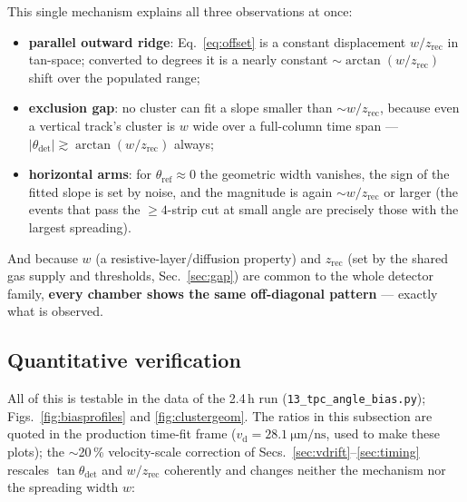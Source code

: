\documentclass[11pt,a4paper]{article}
\newcommand{\vd}{v_{\mathrm{d}}}
\newcommand{\thref}{\theta_{\mathrm{ref}}}
\newcommand{\thdet}{\theta_{\mathrm{det}}}
\newcommand{\umns}{\micro\meter\per\nano\second}
\begin{document}
This single mechanism explains all three observations at once:
\begin{itemize}
  \item \textbf{parallel outward ridge}: Eq.~\eqref{eq:offset} is a constant
        displacement $w/z_{\mathrm{rec}}$ in tan-space; converted to degrees
        it is a nearly constant $\sim\arctan(w/z_{\mathrm{rec}})$ shift over
        the populated range;
  \item \textbf{exclusion gap}: no cluster can fit a slope smaller than
        $\sim w/z_{\mathrm{rec}}$, because even a vertical track's cluster is
        $w$ wide over a full-column time span ---
        $|\thdet| \gtrsim \arctan(w/z_{\mathrm{rec}})$ always;
  \item \textbf{horizontal arms}: for $\thref\approx 0$ the geometric width
        vanishes, the sign of the fitted slope is set by noise, and the
        magnitude is again $\sim w/z_{\mathrm{rec}}$ or larger (the events
        that pass the $\geq 4$-strip cut at small angle are precisely those
        with the largest spreading).
\end{itemize}
And because $w$ (a resistive-layer/diffusion property) and $z_{\mathrm{rec}}$
(set by the shared gas supply and thresholds, Sec.~\ref{sec:gap}) are common
to the whole detector family, \textbf{every chamber shows the same
off-diagonal pattern} --- exactly what is observed.

\subsection{Quantitative verification}

All of this is testable in the data of the 2.4\,h run
(\texttt{13\_tpc\_angle\_bias.py}); Figs.~\ref{fig:biasprofiles} and
\ref{fig:clustergeom}.  The ratios in this subsection are quoted in the
production time-fit frame ($\vd = \SI{28.1}{\umns}$, used to make these
plots); the $\sim$20\,\% velocity-scale correction of
Secs.~\ref{sec:vdrift}--\ref{sec:timing} rescales $\tan\thdet$ and
$w/z_{\mathrm{rec}}$ coherently and changes neither the mechanism nor the
spreading width $w$:
\end{document}
